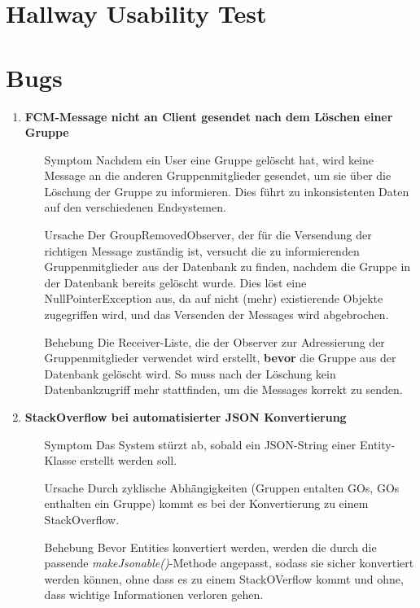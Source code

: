 \documentclass[11pt,a4paper]{scrartcl}
\def\threedigits#1{%
  \ifnum#1<100 0\fi
  \ifnum#1<10 0\fi
  \number#1}
\begin{document}
\section{Hallway Usability Test}

\newpage

\section{Bugs}

\begin{enumerate}[label={\textbf{/B\protect\threedigits{\theenumi}0/}}, leftmargin=*]
\item \textbf{FCM-Message nicht an Client gesendet nach dem Löschen einer Gruppe}
	\begin{itemize}
		\item[Symptom]
		Nachdem ein User eine Gruppe gelöscht hat, wird keine Message an die anderen Gruppenmitglieder gesendet, um sie über die Löschung der Gruppe zu informieren. Dies führt zu inkonsistenten Daten auf den verschiedenen Endsystemen.
		\item[Ursache]
		Der GroupRemovedObserver, der für die Versendung der richtigen Message zuständig ist, versucht die zu informierenden Gruppenmitglieder aus der Datenbank zu finden, nachdem die Gruppe in der Datenbank bereits gelöscht wurde. Dies löst eine NullPointerException aus, da auf nicht (mehr) existierende Objekte zugegriffen wird, und das Versenden der Messages wird abgebrochen.
		\item[Behebung]
		Die Receiver-Liste, die der Observer zur Adressierung der Gruppenmitglieder verwendet wird erstellt, \textbf{bevor} die Gruppe aus der Datenbank gelöscht wird. So muss nach der Löschung kein Datenbankzugriff mehr stattfinden, um die Messages korrekt zu senden.
	\end{itemize}

\item \textbf{StackOverflow bei automatisierter JSON Konvertierung}
	\begin{itemize}
		\item[Symptom]
		Das System stürzt ab, sobald ein JSON-String einer Entity-Klasse erstellt werden soll.
		\item[Ursache]
		Durch zyklische Abhängigkeiten (Gruppen entalten GOs, GOs enthalten ein Gruppe) kommt es bei der Konvertierung zu einem StackOverflow.
		\item[Behebung]
		Bevor Entities konvertiert werden, werden die durch die passende \textit{makeJsonable()}-Methode angepasst, sodass sie sicher konvertiert werden können, ohne dass es zu einem StackOVerflow kommt und ohne, dass wichtige Informationen verloren gehen.
	\end{itemize}


\end{enumerate}
\end{document}
